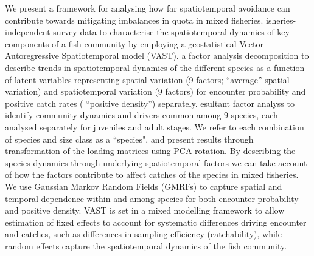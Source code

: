 \documentclass[fleqn,10pt]{wlscirep}
\begin{document}
\begin{linenumbers}
We present a framework for analysing how far spatiotemporal avoidance can
contribute towards mitigating imbalances in quota in mixed fisheries.
isheries-independent survey data
 to characterise the spatiotemporal dynamics of key
components of a fish community by employing a geostatistical Vector
Autoregressive Spatiotemporal model (VAST). 
 a factor analysis decomposition to describe trends in
spatiotemporal dynamics of the different species as a function of latent
variables\cite{Thorson2015} representing spatial variation (9 factors;
 ``average'' spatial
variation) and spatiotemporal variation (9 factors) for encounter probability
and positive catch rates ( ``positive density'') separately\cite{Thorson2015a}.  esultant factor
analyss  to identify community
dynamics and drivers common among 9 species, each analysed separately for
juveniles and adult stages.  We refer to each combination of species and size
class as a ``species", and present results through
transformation of the loading matrices using PCA rotation.  By describing the species
dynamics through underlying  spatiotemporal
factors we can take account of how the factors contribute to affect catches of
the species in mixed fisheries.  We use Gaussian Markov Random Fields (GMRFs)
to capture spatial and temporal dependence within and among
species for both encounter probability and positive
density\cite{Thorson2013}. VAST is set in a mixed modelling framework to allow
estimation of fixed effects to account for systematic differences driving
encounter and catches, such as differences in sampling efficiency (catchability), while random effects capture the spatiotemporal
dynamics of the fish community.\\


\end{linenumbers}
\end{document}
